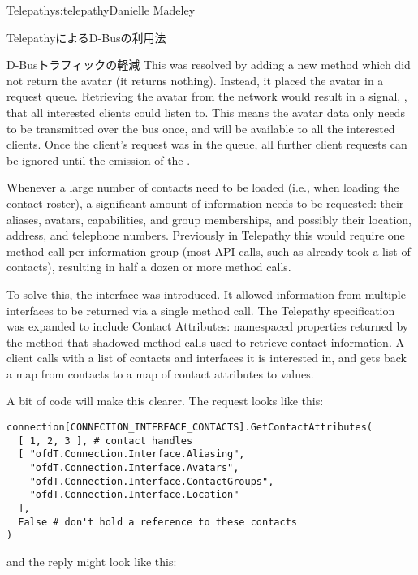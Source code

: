 \begin{aosachapter}{Telepathy}{s:telepathy}{Danielle Madeley}
\begin{aosasect1}{TelepathyによるD-Busの利用法}
\begin{aosasect2}{D-Busトラフィックの軽減}
This was resolved by adding a new method which did not return the
avatar (it returns nothing). Instead, it placed the avatar in a
request queue.  Retrieving the avatar from the network would result in
a signal, , that all interested clients could
listen to. This means the avatar data only needs to be transmitted
over the bus once, and will be available to all the interested
clients. Once the client's request was in the queue, all further
client requests can be ignored until the emission of the
.

Whenever a large number of contacts need to be loaded (i.e., when
loading the contact roster), a significant amount of information needs
to be requested: their aliases, avatars, capabilities, and group
memberships, and possibly their location, address, and telephone numbers.
Previously in Telepathy this would require one method call per
information group (most API calls, such as  already
took a list of contacts), resulting in half a dozen or more method calls.

To solve this, the  interface was introduced.  It
allowed information from multiple interfaces to be returned via a
single method call. The Telepathy specification was expanded to
include Contact Attributes: namespaced properties returned by the
 method that shadowed method calls used to
retrieve contact information. A client calls
 with a list of contacts and interfaces it
is interested in, and gets back a map from contacts to a map of
contact attributes to values.

A bit of code will make this clearer.  The request looks like this:

\begin{verbatim}
connection[CONNECTION_INTERFACE_CONTACTS].GetContactAttributes(
  [ 1, 2, 3 ], # contact handles
  [ "ofdT.Connection.Interface.Aliasing",
    "ofdT.Connection.Interface.Avatars",
    "ofdT.Connection.Interface.ContactGroups",
    "ofdT.Connection.Interface.Location"
  ],
  False # don't hold a reference to these contacts
)
\end{verbatim}

\noindent and the reply might look like this:


\end{aosasect2}
\end{aosasect1}
\end{aosachapter}
